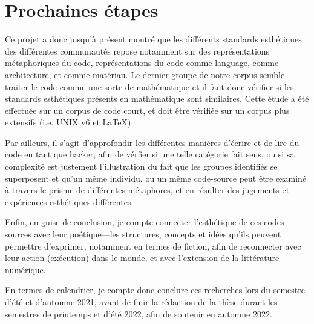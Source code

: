 \documentclass{article}
\begin{document}
\section{Prochaines étapes}

Ce projet a donc jusqu'à présent montré que les différents standards esthétiques des différentes communautés repose notamment sur des représentations métaphoriques du code, représentations du code comme language, comme architecture, et comme matériau. Le dernier groupe de notre corpus semble traiter le code comme une sorte de mathématique et il faut donc vérifier si les standards esthétiques présents en mathématique\cite{rota_phenomenology_1997} sont similaires. Cette étude a été effectuée sur un corpus de code court, et doit être vérifiée sur un corpus plus extensifs (i.e. UNIX v6 et LaTeX).

Par ailleurs, il s'agit d'approfondir les différentes manières d'écrire et de lire du code en tant que hacker, afin de vérfier si une telle catégorie fait sens, ou si sa complexité est justement l'illustration du fait que les groupes identifiés se superposent et qu'un même individu, ou un même code-source peut être examiné à travers le prisme de différentes métaphores, et en résulter des jugements et expériences esthétiques différentes.

Enfin, en guise de conclusion, je compte connecter l'esthétique de ces codes sources avec leur poétique—les structures, concepts et idées qu'ils peuvent permettre d'exprimer, notamment en termes de fiction, afin de reconnecter avec leur action (exécution) dans le monde, et avec l'extension de la littérature numérique.

En termes de calendrier, je compte donc conclure ces recherches lors du semestre d'été et d'automne 2021, avant de finir la rédaction de la thèse durant les semestres de printemps et d'été 2022, afin de soutenir en automne 2022.

\pagebreak



\end{document}
